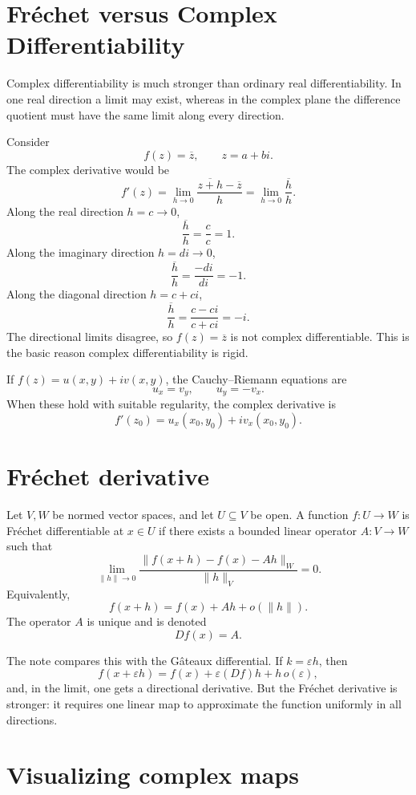 
\section{Fréchet versus Complex Differentiability}

Complex differentiability is much stronger than ordinary real differentiability.  In one real direction a limit may exist, whereas in the complex plane the difference quotient must have the same limit along every direction.

Consider
\[
  f(z)=\overline z,\qquad z=a+bi.
\]
The complex derivative would be
\[
  f'(z)=\lim_{h\to0}\frac{\overline{z+h}-\overline z}{h}=\lim_{h\to0}\frac{\overline h}{h}.
\]
Along the real direction \(h=c\to0\),
\[
  \frac{\overline h}{h}=\frac c c=1.
\]
Along the imaginary direction \(h=di\to0\),
\[
  \frac{\overline h}{h}=\frac{-di}{di}=-1.
\]
Along the diagonal direction \(h=c+ci\),
\[
  \frac{\overline h}{h}=\frac{c-ci}{c+ci}=-i.
\]
The directional limits disagree, so \(f(z)=\overline z\) is not complex differentiable.  This is the basic reason complex differentiability is rigid.

If \(f(z)=u(x,y)+iv(x,y)\), the Cauchy--Riemann equations are
\[
  u_x=v_y,\qquad u_y=-v_x.
\]
When these hold with suitable regularity, the complex derivative is
\[
  f'(z_0)=u_x(x_0,y_0)+iv_x(x_0,y_0).
\]

\section{Fréchet derivative}

Let \(V,W\) be normed vector spaces, and let \(U\subseteq V\) be open.  A function \(f:U\to W\) is Fréchet differentiable at \(x\in U\) if there exists a bounded linear operator \(A:V\to W\) such that
\[
  \lim_{\|h\|\to0}\frac{\|f(x+h)-f(x)-Ah\|_W}{\|h\|_V}=0.
\]
Equivalently,
\[
  f(x+h)=f(x)+Ah+o(\|h\|).
\]
The operator \(A\) is unique and is denoted
\[
  Df(x)=A.
\]

The note compares this with the Gâteaux differential.  If \(k=\varepsilon h\), then
\[
  f(x+\varepsilon h)=f(x)+\varepsilon(Df)h+h\,o(\varepsilon),
\]
and, in the limit, one gets a directional derivative.  But the Fréchet derivative is stronger: it requires one linear map to approximate the function uniformly in all directions.

\section{Visualizing complex maps}

